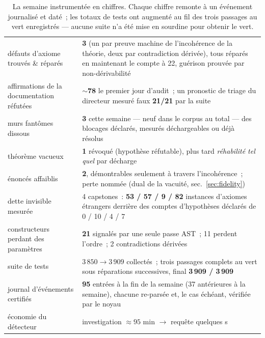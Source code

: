 \documentclass[11pt]{article}
\theoremstyle{remark}\newtheorem{example}{Exemple}
\begin{document}
\begin{table}[h]\centering\small
\begin{tabular}{lp{7.6cm}}
\toprule
défauts d'axiome trouvés \& réparés & \textbf{3} (un par preuve machine de
l'incohérence de la théorie, deux par contradiction dérivée), tous réparés en
maintenant le compte à 22, guérison prouvée par non-dérivabilité \\
affirmations de la documentation réfutées & ${\sim}\textbf{78}$ le premier jour
d'audit~; un pronostic de triage du directeur mesuré faux \textbf{21/21} par la suite \\
murs fantômes dissous & \textbf{3} cette semaine --- neuf dans le corpus au total ---
des blocages déclarés, mesurés déchargeables ou déjà résolus \\
théorème vacueux & \textbf{1} révoqué (hypothèse réfutable), plus tard
\emph{réhabilité tel quel} par décharge \\
énoncés affaiblis & \textbf{2}, démontrables seulement à travers l'incohérence~; perte
nommée (dual de la vacuité, sec.~\ref{sec:fidelity}) \\
dette invisible mesurée & 4 capstones~: \textbf{53 / 57 / 9 / 82} instances d'axiomes
étrangers derrière des comptes d'hypothèses déclarés de 0 / 10 / 4 / 7 \\
constructeurs perdant des paramètres & \textbf{21} signalés par une seule passe AST~;
11 perdent l'ordre~; 2 contradictions dérivées \\
suite de tests & $3\,850 \to 3\,909$ collectés~; trois passages complets au vert sous
réparations successives, final \textbf{3\,909 / 3\,909} \\
journal d'événements certifiés & \textbf{95} entrées à la fin de la semaine (37
antérieures à la semaine), chacune re-parsée et, le cas échéant, vérifiée par le
noyau \\
économie du détecteur & investigation $\approx 95$ min $\to$ requête quelques s \\
\bottomrule
\end{tabular}
\caption{La semaine instrumentée en chiffres. Chaque chiffre remonte à un événement
journalisé et daté~; les totaux de tests ont augmenté au fil des trois passages au vert
enregistrés --- aucune suite n'a été mise en sourdine pour obtenir le vert.}
\end{table}
\end{document}
